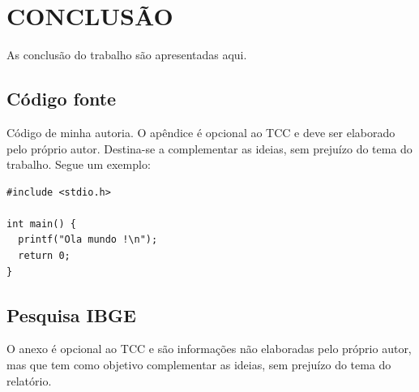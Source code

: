 \documentclass[
	12pt,				%
	openright,			%
	oneside,			%
	a4paper,			%
	chapter=TITLE,		%
	section=TITLE,		%
	brazil				%
	]{abntex2}
\begin{document}
\chapter{CONCLUSÃO}

As conclusão do trabalho são apresentadas aqui.





%
%


\begin{apendicesenv}

\chapter{Código fonte}
Código de minha autoria. O apêndice é opcional ao TCC e deve ser elaborado pelo próprio autor. Destina-se a complementar as ideias, sem prejuízo do tema do trabalho. Segue um exemplo:

\scriptsize
\begin{lstlisting}
#include <stdio.h>

int main() {
  printf("Ola mundo !\n");
  return 0;
}
\end{lstlisting}

\end{apendicesenv}

\begin{anexosenv}

\chapter{Pesquisa IBGE}
O anexo é opcional ao TCC e são informações não elaboradas pelo próprio autor, mas que tem como objetivo complementar as ideias, sem prejuízo do tema do relatório.

\end{anexosenv}

\label{nropaginas}


\printindex
\end{document}
